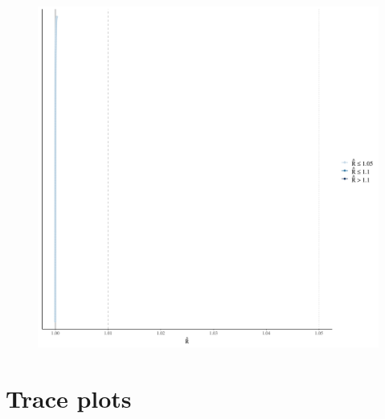 \documentclass[
]{report}
\begin{document}
\begin{figure}

{\centering \includegraphics[width=1\textwidth,height=\textheight]{diagnostic_plots_files/figure-pdf/unnamed-chunk-10-1.pdf}

}

\end{figure}

\hypertarget{trace-plots-3}{%
\section{Trace plots}\label{trace-plots-3}}
\end{document}
